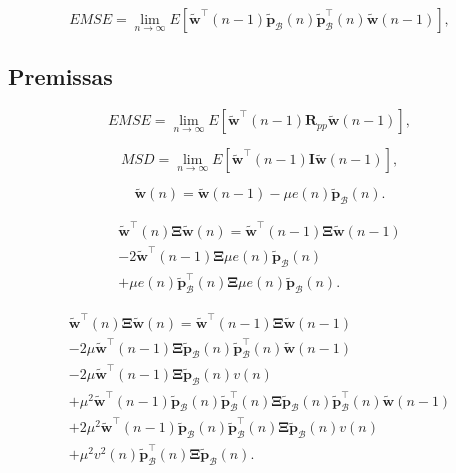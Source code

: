 \begin{equation}
    EMSE = \lim_{n\rightarrow \infty} E \left[\tilde{\mathbf{w}}^\top(n-1)\tilde{\mathbf{p}}_{\mathcal{B}}(n)\tilde{\mathbf{p}}^\top_{\mathcal{B}}(n)\tilde{\mathbf{w}}(n-1)\right],\label{eq:emse_wppw} 
\end{equation}

\subsection{Premissas}

\begin{equation}
    EMSE = \lim_{n\rightarrow \infty} E \left[\tilde{\mathbf{w}}^\top(n-1)\mathbf{R}_{pp}\tilde{\mathbf{w}}(n-1)\right],\label{eq:emse_wRw} 
\end{equation}

\begin{equation}
    MSD = \lim_{n\rightarrow \infty} E \left[\tilde{\mathbf{w}}^\top(n-1)\mathbf{I}\tilde{\mathbf{w}}(n-1)\right], 
\end{equation}

\begin{equation}
    \tilde{\mathbf{w}}(n) = \tilde{\mathbf{w}}(n-1) - \mu e(n) \tilde{\mathbf{p}}_{\mathcal{B}}(n).\label{eq:w_tilde_adapt}
\end{equation}

\begin{multline}
    \tilde{\mathbf{w}}^\top(n)\boldsymbol{\Xi}\tilde{\mathbf{w}}(n) = \tilde{\mathbf{w}}^\top(n-1)\boldsymbol{\Xi}\tilde{\mathbf{w}}(n-1) \\- 2\tilde{\mathbf{w}}^\top(n-1)\boldsymbol{\Xi}\mu e(n)\tilde{\mathbf{p}}_{\mathcal{B}}(n) 
     \\+ \mu e(n)\tilde{\mathbf{p}}^\top_{\mathcal{B}}(n)\boldsymbol{\Xi}\mu e(n)\tilde{\mathbf{p}}_{\mathcal{B}}(n) .
\end{multline}

\begin{multline}
    \tilde{\mathbf{w}}^\top(n)\boldsymbol{\Xi}\tilde{\mathbf{w}}(n) = \tilde{\mathbf{w}}^\top(n-1)\boldsymbol{\Xi}\tilde{\mathbf{w}}(n-1)\\-
    2\mu\tilde{\mathbf{w}}^\top(n-1)\boldsymbol{\Xi}\tilde{\mathbf{p}}_{\mathcal{B}}(n)\tilde{\mathbf{p}}_{\mathcal{B}}^\top(n)\tilde{\mathbf{w}}(n-1) \\-
    2\mu\tilde{\mathbf{w}}^\top(n-1)\boldsymbol{\Xi}\tilde{\mathbf{p}}_{\mathcal{B}}(n)v(n) \\+
    \mu^2 \tilde{\mathbf{w}}^{\top}(n-1)\tilde{\mathbf{p}}_{\mathcal{B}}(n)\tilde{\mathbf{p}}^\top_{\mathcal{B}}(n)\boldsymbol{\Xi}\tilde{\mathbf{p}}_{\mathcal{B}}(n)\tilde{\mathbf{p}}_{\mathcal{B}}^\top(n)\tilde{\mathbf{w}}(n-1)\\+
    2\mu^2 \tilde{\mathbf{w}}^{\top}(n-1)\tilde{\mathbf{p}}_{\mathcal{B}}(n)\tilde{\mathbf{p}}^\top_{\mathcal{B}}(n)\boldsymbol{\Xi}\tilde{\mathbf{p}}_{\mathcal{B}}(n)v(n)\\+
    \mu^2 v^2(n)\tilde{\mathbf{p}}^\top_{\mathcal{B}}(n)\boldsymbol{\Xi}\tilde{\mathbf{p}}_{\mathcal{B}}(n).\label{eq:wSw}
\end{multline}

